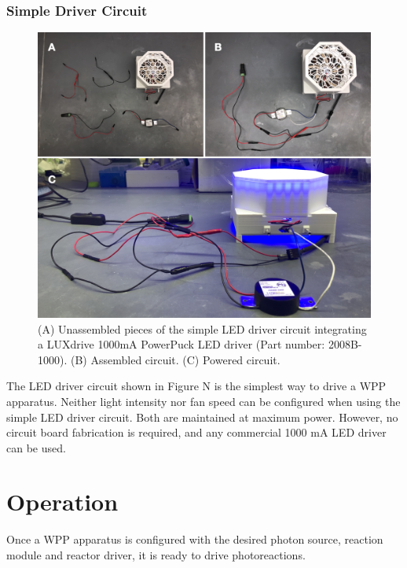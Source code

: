 \documentclass[11pt]{article}
\let\stdsection\section
\renewcommand\section{\clearpage\stdsection}
\begin{document}
\subsubsection{Simple Driver Circuit} \label{SEC:simple-driver}

\begin{figure}[H]
	\centering
	\includegraphics[width=\textwidth]{"./fign7.png"}
	\caption{(A) Unassembled pieces of the simple LED driver circuit integrating a LUXdrive 1000mA PowerPuck LED driver (Part number: 2008B-1000). (B) Assembled circuit. (C) Powered circuit.}
\end{figure}

The LED driver circuit shown in Figure N is the simplest way to drive a WPP apparatus.
Neither light intensity nor fan speed can be configured when using the simple LED driver circuit.
Both are maintained at maximum power.
However, no circuit board fabrication is required, and any commercial 1000 mA LED driver can be used.

\section{Operation}

Once a WPP apparatus is configured with the desired photon source, reaction module and reactor driver, it is ready to drive photoreactions.
\end{document}
